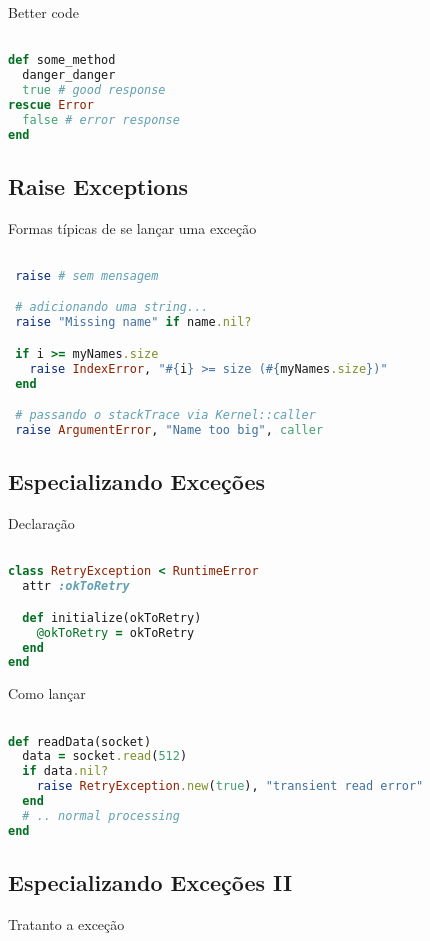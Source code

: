 \documentclass[serif,mathserif]{article}
\begin{document}
Better code

\begin{lstlisting}[language=ruby]

def some_method
  danger_danger
  true # good response
rescue Error
  false # error response
end
\end{lstlisting}

\subsection{Raise Exceptions}

Formas típicas de se lançar uma exceção

\begin{lstlisting}[language=ruby]

 raise # sem mensagem

 # adicionando uma string...
 raise "Missing name" if name.nil?

 if i >= myNames.size
   raise IndexError, "#{i} >= size (#{myNames.size})"
 end

 # passando o stackTrace via Kernel::caller
 raise ArgumentError, "Name too big", caller
\end{lstlisting}

\subsection{Especializando Exceções}

Declaração

\begin{lstlisting}[language=ruby]

class RetryException < RuntimeError
  attr :okToRetry

  def initialize(okToRetry)
    @okToRetry = okToRetry
  end
end
\end{lstlisting}

Como lançar

\begin{lstlisting}[language=ruby]

def readData(socket)
  data = socket.read(512)
  if data.nil?
    raise RetryException.new(true), "transient read error"
  end
  # .. normal processing
end
\end{lstlisting}

\subsection{Especializando Exceções II}

Tratanto a exceção
\end{document}
